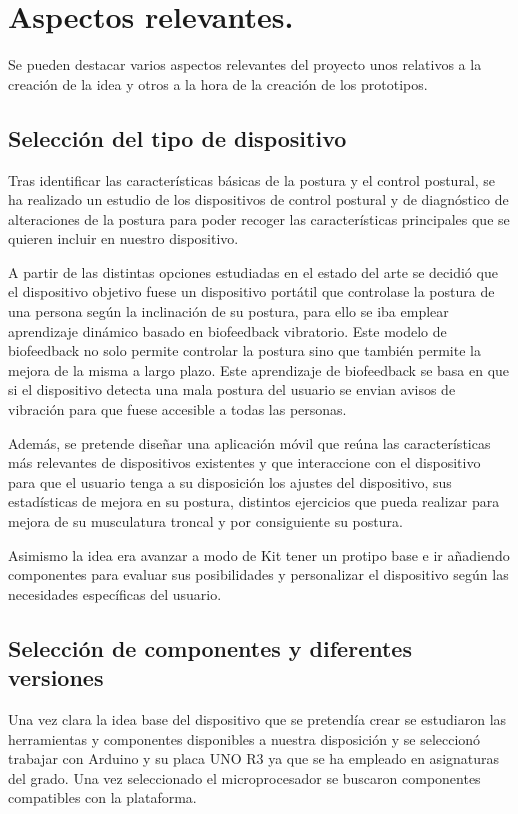 \section{Aspectos relevantes.}

Se pueden destacar varios aspectos relevantes del proyecto unos relativos a la creación de la idea y otros a la hora de la creación de los prototipos.

\subsection{Selección del tipo de dispositivo}
Tras identificar las características básicas de la postura y el control postural, se ha realizado un estudio de los dispositivos de control postural y de diagnóstico de alteraciones de la postura para poder recoger las características principales que se quieren incluir en nuestro dispositivo. 

A partir de las distintas opciones estudiadas en el estado del arte se decidió que el dispositivo objetivo fuese un dispositivo portátil que controlase la postura de una persona según la inclinación de su postura, para ello se iba emplear aprendizaje dinámico basado en biofeedback vibratorio. Este modelo de biofeedback no solo permite controlar la postura sino que también permite la mejora de la misma a largo plazo. Este aprendizaje de biofeedback se basa en que si el dispositivo detecta una mala postura del usuario se envian avisos de vibración para que fuese accesible a todas las personas. 

Además, se pretende diseñar una aplicación móvil que reúna las características más relevantes de dispositivos existentes y que interaccione con el dispositivo para que el usuario tenga a su disposición los ajustes del dispositivo, sus estadísticas de mejora en su postura, distintos ejercicios que pueda realizar para mejora de su musculatura troncal y por consiguiente su postura.

Asimismo la idea era avanzar a modo de Kit tener un protipo base e ir añadiendo componentes para evaluar sus posibilidades y personalizar el dispositivo según las necesidades específicas del usuario.

\subsection{Selección de componentes y diferentes versiones}
Una vez clara la idea base del dispositivo que se pretendía crear se estudiaron las herramientas y componentes disponibles a nuestra disposición y se seleccionó trabajar con Arduino y su placa UNO R3 ya que se ha empleado en asignaturas del grado. Una vez seleccionado el microprocesador se buscaron componentes compatibles con la plataforma.

